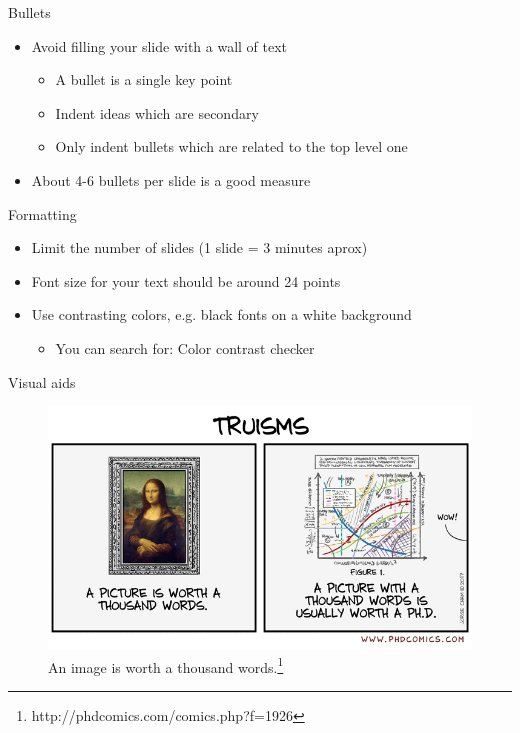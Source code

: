 \documentclass{beamer}
\begin{document}
\begin{frame}[t]{Bullets}
    \begin{itemize}
        \item Avoid filling your slide with a wall of text
        \begin{itemize}
            \item A bullet is a single key point
            \item Indent ideas which are secondary
            \item Only indent bullets which are related to the top level one
        \end{itemize}
        \item About 4-6 bullets per slide is a good measure
    \end{itemize}
\end{frame}
\begin{frame}[t]{Formatting}
    \begin{itemize}
        \item Limit the number of slides (1 slide = 3 minutes aprox)
        \item Font size for your text should be around 24 points
        \item Use contrasting colors, e.g. black fonts on a white background
        \begin{itemize}
            \item You can search for: Color contrast checker
        \end{itemize}
    \end{itemize}
\end{frame}
\begin{frame}[t]{Visual aids}
\vspace{-15pt}
\begin{figure}
    \includegraphics[width=\textwidth]{images/phd022417s}
    \caption{An image is worth a thousand words.\footnote{http://phdcomics.com/comics.php?f=1926}}
    \label{fig:visual-aids}
\end{figure}

\end{frame}
\end{document}
